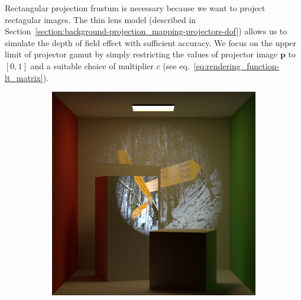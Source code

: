 Rectangular projection frustum is necessary because we want to project rectagular images. The thin lens model (described in Section~\ref{section:background-projection_mapping-projectors-dof}) allows us to simulate the depth of field effect with sufficient accuracy. We focus on the upper limit of projector gamut by simply restricting the values of projector image \(\bm{p}\) to \([0, 1]\) and a suitable choice of multiplier \(c\) (see eq.~\ref{eq:rendering_function-lt_matrix}).

\begin{figure}[]
    \centering
    \begin{subfigure}[b]{0.32\textwidth}
        \centering
        \includegraphics[width=\textwidth]{images/03-projector_features-spotlight.jpg}
        \caption{}
        \label{fig:methods_projector_features_spotlight}
    \end{subfigure}
    \hfill
    \begin{subfigure}[b]{0.32\textwidth}
        \centering

\end{subfigure}
\end{figure}
